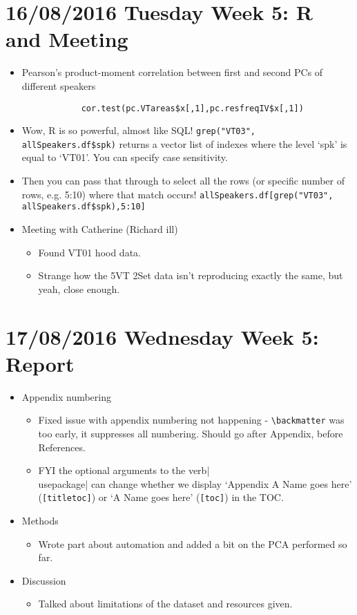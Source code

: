 \documentclass{article}
\begin{document}
\section*{16/08/2016 Tuesday Week 5: R and Meeting}
\begin{itemize}
    \item Pearson's product-moment correlation between first and second PCs of different speakers \begin{verbatim}
            cor.test(pc.VTareas$x[,1],pc.resfreqIV$x[,1])
        \end{verbatim}
    \item Wow, R is so powerful, almost like SQL! \verb|grep("VT03", allSpeakers.df$spk)| returns a vector list of indexes where the level `spk' is equal to `VT01'. You can specify case sensitivity.
    \item Then you can pass that through to select all the rows (or specific number of rows, e.g. 5:10) where that match occurs! \verb|allSpeakers.df[grep("VT03", allSpeakers.df$spk),5:10]|
    \item Meeting with Catherine (Richard ill)
    \begin{itemize}
        \item Found VT01 hood data.
        \item Strange how the 5VT 2Set data isn't reproducing exactly the same, but yeah, close enough.
    \end{itemize}
\end{itemize}

\section*{17/08/2016 Wednesday Week 5: Report}
\begin{itemize}
    \item Appendix numbering
    \begin{itemize}
        \item Fixed issue with appendix numbering not happening - \verb|\backmatter| was too early, it suppresses all numbering. Should go after Appendix, before References.
        \item FYI the optional arguments to the verb|\\usepackage| can change whether we display `Appendix A Name goes here' (\verb|[titletoc]|) or `A Name goes here' (\verb|[toc]|) in the TOC. 
    \end{itemize}
    \item Methods
    \begin{itemize}
        \item Wrote part about automation and added a bit on the PCA performed so far.
    \end{itemize}
    \item Discussion
    \begin{itemize}
        \item Talked about limitations of the dataset and resources given.
    \end{itemize}
\end{itemize}
\end{document}
